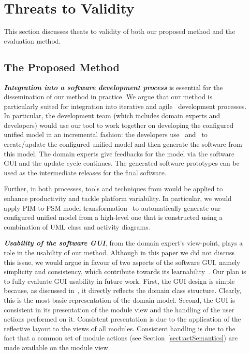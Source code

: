 \newpage
\section{Threats to Validity} \label{sect:threats}
This section discusses theats to validity of both our proposed method and the evaluation method.

\subsection{The Proposed Method}

\textbf{\textit{Integration into a software development process}} is essential for the dissemination of our method in practice. We argue that our method is particularly suited for integration into iterative \cite{larman_applying_2004} and agile~\cite{beck_manifesto_2017} development processes. In particular, the development team (which includes domain experts and developers) would use our tool to work together on developing the configured unified model in an incremental fashion: the developers use \dcsl~and \agl~to create/update the configured unified model and then generate the software from this model. The domain experts give feedbacks for the model via the software GUI and the update cycle continues. The generated software prototypes can be used as the intermediate releases for the final software.

Further, in both processes, tools and techniques from  would be applied to enhance productivity and tackle platform variability. In particular, we would apply PIM-to-PSM model transformation~\cite{kent_model_2002,brambilla_model-driven_2012} to automatically generate our configured unified model from a high-level one that is constructed using a combination of UML class and activity diagrams.

\textbf{\textit{Usability of the software GUI}}, from the domain expert's view-point, plays a role in the usability of our method. Although in this paper we did not discuss this issue, we would argue in favour of two aspects of the software GUI, namely simplicity and consistency, which contribute towards its learnability~\cite{folmer_architecting_2004}. Our plan is to fully evaluate GUI usability in future work. First, the GUI design is simple because, as discussed in~\cite{le_domain_2018}, it directly reflects the domain class structure. Clearly, this is the most basic representation of the domain model. Second, the GUI is consistent in its presentation of the module view and the handling of the user actions performed on it. Consistent presentation is due to the application of the reflective layout to the views of all modules. Consistent handling is due to the fact that a common set of module actions (see Section~\ref{sect:actSemantics}) are made available on the module view.

